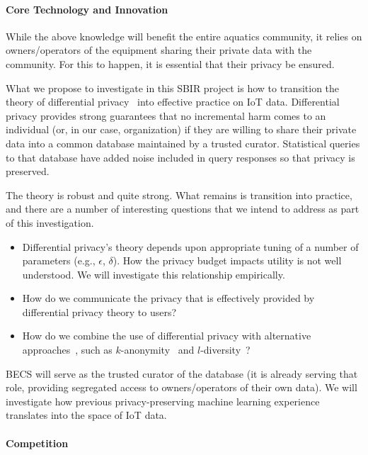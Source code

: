 \paragraph{Core Technology and Innovation}
\label{sec:tech}

While the above knowledge will benefit the entire aquatics community, it relies
on owners/operators of the equipment sharing their private data with the
community.  For this to happen, it is essential that their privacy be ensured.

What we propose to investigate in this SBIR project is how to transition
the theory of differential privacy~\cite{dwork11,dr14} into effective
practice on IoT data.  Differential privacy provides strong guarantees
that no incremental harm comes to an individual (or, in our case, organization)
if they are willing to share their private data into a common database
maintained by a trusted curator. Statistical queries to that database
have added noise included in query responses so that privacy is preserved.

The theory is robust and quite strong.  What remains is transition into
practice, and there are a number of interesting questions that we intend
to address as part of this investigation.
\begin{itemize}
\item Differential privacy's theory depends upon appropriate tuning of a number
of parameters (e.g., $\epsilon$, $\delta$).  How the privacy budget impacts
utility is not well understood.  We will investigate this relationship empirically.
\item How do we communicate the privacy that is effectively provided by differential privacy theory to users?
\item How do we combine the use of differential privacy with alternative
approaches~\cite{ct13}, such as $k$-anonymity~\cite{samarati01,sweeney02} and
$l$-diversity~\cite{mkgv07}?
\end{itemize}
BECS will serve as the trusted curator of the database (it is already serving
that role, providing segregated access to owners/operators of their own data).
We will investigate how previous privacy-preserving machine learning
experience~\cite{acgmmtz16,ss15} translates into the space of IoT data.

\paragraph{Competition}
\label{sec:competition}


